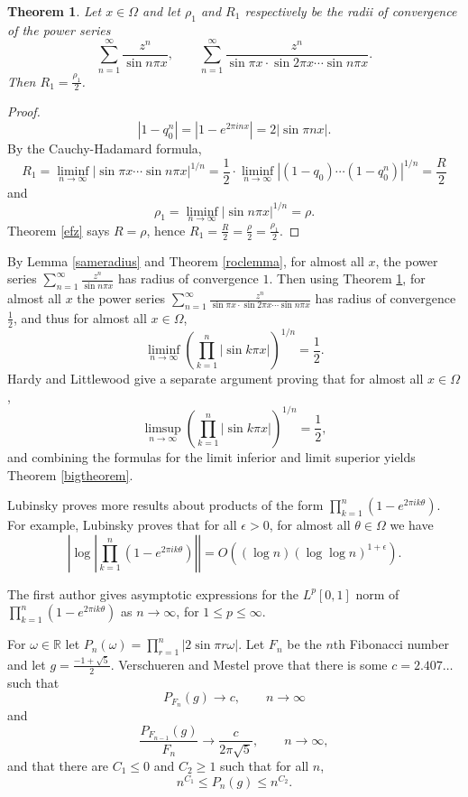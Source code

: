 \documentclass{amsart}
\newtheorem{theorem}{Theorem}
\begin{document}
\begin{theorem}
Let $x \in \Omega$ and let $\rho_1$ and $R_1$  respectively be the radii  of convergence of the power
series
\[
\sum_{n=1}^\infty \frac{z^n}{\sin n\pi x},\qquad \sum_{n=1}^\infty \frac{z^n}{\sin \pi x \cdot
\sin 2\pi x  \cdots \sin n\pi x}.
\]
Then $R_1=\frac{\rho_1}{2}$. 
\label{HLsineseries}
\end{theorem}
\begin{proof}
\[
|1-q_0^n| = |1-e^{2\pi inx}| = 2 |\sin \pi nx|.
\]
By the Cauchy-Hadamard formula, 
\[
R_1 = \liminf_{n \to \infty} |\sin \pi x\cdots \sin n\pi x|^{1/n} = 
\frac{1}{2} \cdot \liminf_{n \to \infty} |(1-q_0)\cdots (1-q_0^n)|^{1/n}
=\frac{R}{2}
\]
and 
\[
\rho_1 = \liminf_{n \to \infty} |\sin n\pi x|^{1/n} = 
\rho.
\]
Theorem \ref{efz} says $R=\rho$, hence $R_1 = \frac{R}{2} = \frac{\rho}{2}=\frac{\rho_1}{2}$.  
\end{proof}




By Lemma \ref{sameradius} and Theorem \ref{roclemma}, for almost all $x$, the power series $\sum_{n=1}^\infty \frac{z^n}{\sin n\pi x}$ has radius of convergence $1$.
Then using Theorem \ref{HLsineseries}, for
almost all $x$  the power series $\sum_{n=1}^\infty \frac{z^n}{\sin \pi x \cdot
\sin 2\pi x  \cdots \sin n\pi x}$ has radius of convergence $\frac{1}{2}$, and thus for almost all $x \in \Omega$,
\[
\liminf_{n \to \infty} \left( \prod_{k=1}^n |\sin k\pi x| \right)^{1/n} = \frac{1}{2}.
\]
Hardy and Littlewood give a separate argument \cite[p.~88, Eq.~4.3]{XXIV} proving that for almost all $x \in \Omega$,
\[
\limsup_{n \to \infty} \left( \prod_{k=1}^n |\sin k\pi x| \right)^{1/n} = \frac{1}{2},
\]
and combining the formulas for the limit inferior and limit superior yields Theorem \ref{bigtheorem}.



Lubinsky \cite{MR1684685} proves more results about products of the form $\prod_{k=1}^n (1-e^{2\pi i k\theta})$. For example,
Lubinsky \cite[p.~219, Theorem 1.1]{MR1684685} proves that for all $\epsilon>0$, for almost all
$\theta \in \Omega$ we have
\[
\left|\log \left| \prod_{k=1}^n (1-e^{2\pi ik\theta})\right| \right| = O((\log n)(\log \log n)^{1+\epsilon}).
\]

The first author \cite[p.~532, Theorem 2]{MR3061031} gives asymptotic expressions for  the $L^p[0,1]$ norm
of
$\prod_{k=1}^n (1-e^{2\pi ik\theta})$ as $n \to \infty$, for $1 \leq p \leq \infty$.

For $\omega \in  \mathbb{R}$ let $P_n(\omega) = \prod_{r=1}^n |2\sin \pi r \omega|$. 
Let $F_n$ be the $n$th Fibonacci number and let
 $g = \frac{-1+\sqrt{5}}{2}$.
 Verschueren and Mestel \cite[p.~204, Theorem 2.2]{verschueren} prove that
 there is some $c = 2.407\ldots$ such that
\[
P_{F_n}(g) \to c,\qquad n \to \infty
\]
and
\[
\frac{P_{F_{n-1}}(g)}{F_n} \to \frac{c}{2\pi\sqrt{5}},\qquad n \to \infty,
\]
and that there are $C_1 \leq 0$ and $C_2 \geq 1$ such that for all $n$,
\[
n^{C_1} \leq P_n(g) \leq n^{C_2}.
\]
\end{document}
